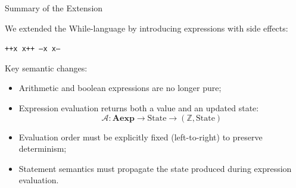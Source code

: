 \documentclass{beamer}
\begin{document}
\begin{frame}{Summary of the Extension}

We extended the While-language by introducing expressions
with side effects:

\begin{center}
\texttt{++x \quad x++ \quad --x \quad x--}
\end{center}

Key semantic changes:

\begin{itemize}
\item Arithmetic and boolean expressions are no longer pure;
\item Expression evaluation returns both a value and an updated state:
\[\mathcal{A}: \textbf{Aexp} \to \text{State} \to (\mathbb{Z},\text{State})\]
\item Evaluation order must be explicitly fixed
(left-to-right) to preserve determinism;
\item Statement semantics must propagate the state
produced during expression evaluation.
\end{itemize}
\end{frame}
\end{document}

